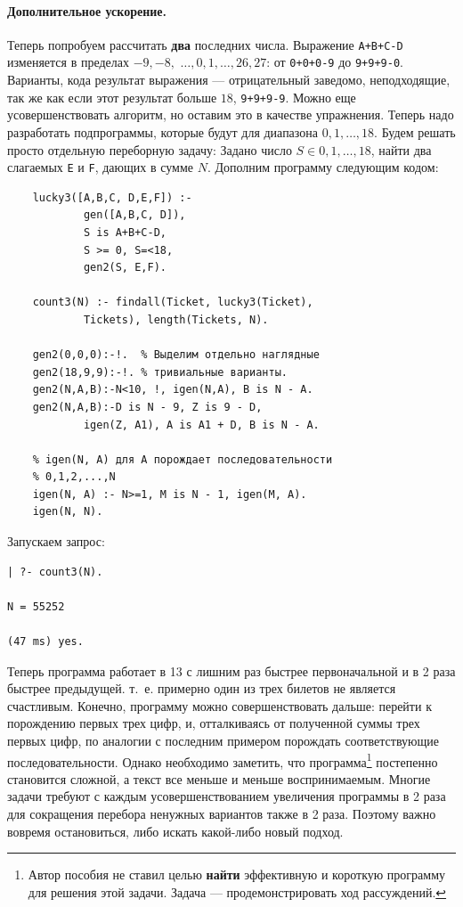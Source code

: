 \documentclass[12pt, openany, twoside]{book} %
\begin{document}
\paragraph{Дополнительное ускорение.} Теперь попробуем рассчитать \textbf{два} последних числа. Выражение \texttt{A+B+C-D} изменяется в пределах $-9,-8,$ $\ldots,0,1,\ldots,26,27$: от \texttt{0+0+0-9} до \texttt{9+9+9-0}. Варианты, кода результат выражения --- отрицательный заведомо, неподходящие, так же как если этот результат больше $18$, \texttt{9+9+9-9}. Можно еще усовершенствовать алгоритм, но оставим это в качестве упражнения. Теперь надо разработать подпрограммы, которые будут для диапазона $0,1,\ldots,18$. Будем решать просто отдельную переборную задачу: Задано число $S \in 0,1,\ldots,18$, найти два слагаемых \texttt{E} и \texttt{F}, дающих в сумме $N$. Дополним программу следующим кодом:
{\tt\begin{verbatim}
    lucky3([A,B,C, D,E,F]) :-
            gen([A,B,C, D]),
            S is A+B+C-D,
            S >= 0, S=<18,
            gen2(S, E,F).

    count3(N) :- findall(Ticket, lucky3(Ticket),
            Tickets), length(Tickets, N).

    gen2(0,0,0):-!.  % Выделим отдельно наглядные
    gen2(18,9,9):-!. % тривиальные варианты.
    gen2(N,A,B):-N<10, !, igen(N,A), B is N - A.
    gen2(N,A,B):-D is N - 9, Z is 9 - D,
            igen(Z, A1), A is A1 + D, B is N - A.

    % igen(N, A) для A порождает последовательности
    % 0,1,2,...,N
    igen(N, A) :- N>=1, M is N - 1, igen(M, A).
    igen(N, N).
\end{verbatim}}
\noindent{} Запускаем запрос:
{\tt\begin{verbatim}
| ?- count3(N).

N = 55252

(47 ms) yes.
\end{verbatim}}
\noindent{}Теперь программа работает в 13 с лишним раз быстрее первоначальной и в 2 раза быстрее предыдущей. т.~е. примерно один из трех билетов не является счастливым. Конечно, программу можно совершенствовать дальше: перейти к порождению первых трех цифр, и, отталкиваясь от полученной суммы трех первых цифр, по аналогии с последним примером порождать соответствующие последовательности. Однако необходимо заметить, что программа\footnote{Автор пособия не ставил целью \textbf{найти} эффективную и короткую программу для решения этой задачи. Задача --- продемонстрировать ход рассуждений.} постепенно становится сложной, а текст все меньше и меньше воспринимаемым. Многие задачи требуют с каждым усовершенствованием увеличения программы в 2 раза для сокращения перебора ненужных вариантов также в 2 раза. Поэтому важно вовремя остановиться, либо искать какой-либо новый подход.
\end{document}

